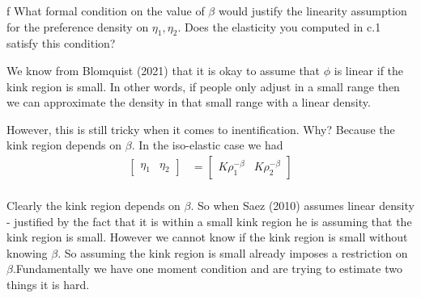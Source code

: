\documentclass{article}
\begin{document}
\begin{problem}{f}
What formal condition on the value of $\beta$ would justify the linearity assumption for the preference density on $\eta_1, \eta_2$. Does the elasticity you computed in c.1 satisfy this condition?
\end{problem}
\begin{solution}

We know from Blomquist (2021) that it is okay to assume that $\phi$
is linear if the kink region is small. In other words, if people only
adjust in a small range then we can approximate the density in that
small range with a linear density. 

However, this is still tricky when it comes to inentification. Why?
Because the kink region depends on $\beta$. In the iso-elastic case
we had
\begin{align*}
\begin{bmatrix}\eta_{1} & \eta_{2}\end{bmatrix} & =\begin{bmatrix}K\rho_{1}^{-\beta} & K\rho_{2}^{-\beta}\end{bmatrix}\\
\end{align*}

Clearly the kink region depends on $\beta$. So when Saez (2010) assumes
linear density - justified by the fact that it is within a small kink
region he is assuming that the kink region is small. However we cannot
know if the kink region is small without knowing $\beta$. So assuming
the kink region is small already imposes a restriction on $\beta$.Fundamentally
we have one moment condition and are trying to estimate two things
it is hard. 
\end{solution}
\end{document}
